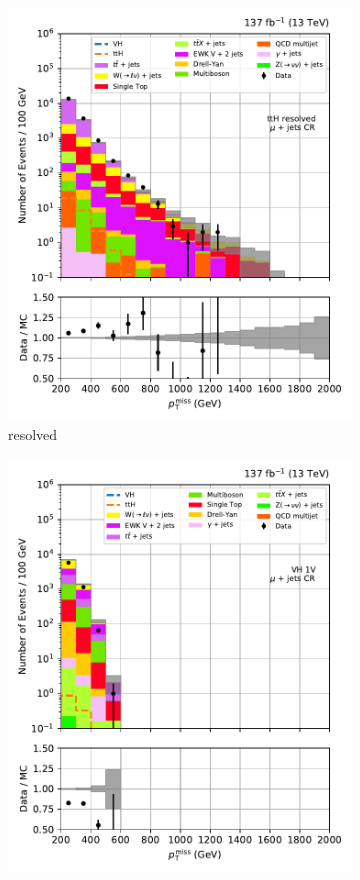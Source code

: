 \begin{figure}[htbp]
\begin{subfigure}[b]{0.24\textwidth}
        \includegraphics[width=\textwidth]{figures/region_plots/full_Run2/region_1/ttH_resolved.pdf}
        \caption{\ttH resolved}
    \end{subfigure}
    \hfill
    \begin{subfigure}[b]{0.24\textwidth}
        \includegraphics[width=\textwidth]{figures/region_plots/full_Run2/region_1/VH_1V.pdf}

\end{subfigure}
\end{figure}
